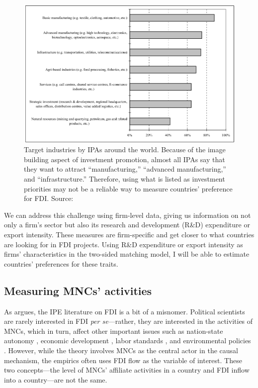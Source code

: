 \begin{figure}[tbp] \centering
  \includegraphics[width=\textwidth,keepaspectratio]{../figure/IPA_target_industries}
  \caption[Target industries by IPA around the world.]{Target industries by IPAs
    around the world. Because of the image building aspect of investment
    promotion, almost all IPAs say that they want to attract ``manufacturing,''
    ``advanced manufacturing,'' and ``infrastructure.'' Therefore, using what is
    listed as investment priorities may not be a reliable way to measure
    countries' preference for FDI. Source: \citet{UNCTAD2001}}
  \label{fig:IPA_target_industries}
\end{figure}

We can address this challenge using firm-level data, giving us information on
not only a firm's sector but also its research and development (R\&D)
expenditure or export intensity. These measures are firm-specific and get closer
to what countries are looking for in FDI projects. Using R\&D expenditure or
export intensity as firms' characteristics in the two-sided matching model, I
will be able to estimate countries' preferences for these traits.

\subsection{Measuring MNCs' activities}

As \citet{Kerner2014} argues, the IPE literature on FDI is a bit of a misnomer.
Political scientists are rarely interested in FDI \textit{per se}---rather, they
are interested in the activities of MNCs, which in turn, affect other important
issues such as nation-state autonomy \citep{Mosley2005}, economic development
\citep{Moran1998}, labor standards \citep{Mosley2007}, and environmental
policies \citep{Prakash2007}. However, while the theory involves MNCs as the
central actor in the causal mechanism, the empirics often uses FDI flow as the
variable of interest. These two concepts---the level of MNCs' affiliate
activities in a country and FDI inflow into a country---are not the same.

